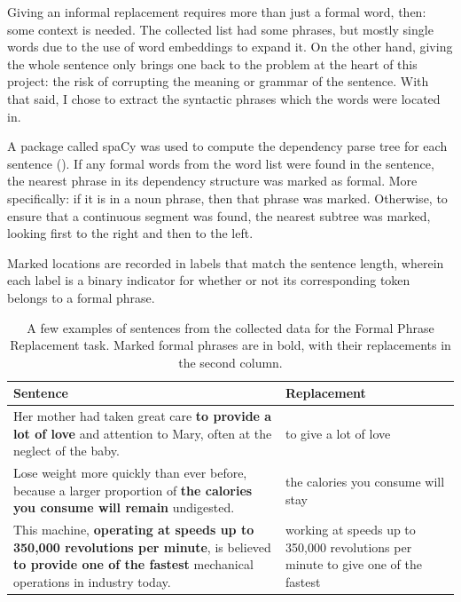 Giving an informal replacement requires more than just a formal word, then: some context is needed. The collected list had some phrases, but mostly single words due to the use of word embeddings to expand it. On the other hand, giving the whole sentence only brings one back to the problem at the heart of this project: the risk of corrupting the meaning or grammar of the sentence. With that said, I chose to extract the syntactic phrases which the words were located in.

A package called spaCy was used to compute the dependency parse tree for each sentence (\cite{honnibal2017spacy}). If any formal words from the word list were found in the sentence, the nearest phrase in its dependency structure was marked as formal. More specifically: if it is in a noun phrase, then that phrase was marked. Otherwise, to ensure that a continuous segment was found, the nearest subtree was marked, looking first to the right and then to the left.

Marked locations are recorded in labels that match the sentence length, wherein each label is a binary indicator for whether or not its corresponding token belongs to a formal phrase.

\begin{table}[h]
\centering
 \begin{tabular}{|| p{8cm} | p{4cm} ||}
 \hline
 Sentence & Replacement \\ [0.3ex] 
 \hline\hline
 Her mother had taken great care \textbf{to provide a lot of love} and attention to Mary, often at the neglect of the baby. & to give a lot of love \\
 \hline
 Lose weight more quickly than ever before, because a larger proportion of \textbf{the calories you consume will remain} undigested. & the calories you consume will stay \\
 \hline
 This machine, \textbf{operating at speeds up to 350,000 revolutions per minute}, is believed \textbf{to provide one of the fastest} mechanical operations in industry today. & working at speeds up to 350,000 revolutions per minute \newline to give one of the fastest \\
 \hline
\end{tabular}
\caption{A few examples of sentences from the collected data for the Formal Phrase Replacement task. Marked formal phrases are in bold, with their replacements in the second column.}
\label{lexical-data-examples}
\end{table}

